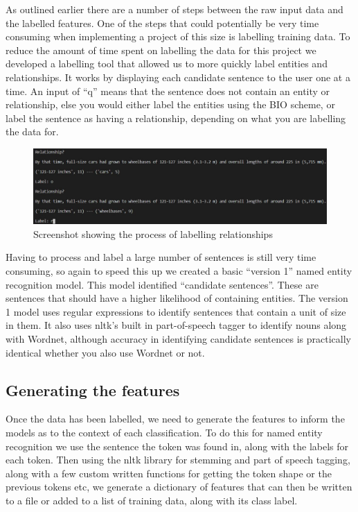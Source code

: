 \documentclass[11pt,oneside]{book}
\begin{document}
As outlined earlier there are a number of steps between the raw input data and the labelled features. One of the steps that could potentially be very time consuming when implementing a project of this size is labelling training data. To reduce the amount of time spent on labelling the data for this project we developed a labelling tool that allowed us to more quickly label entities and relationships. It works by displaying each candidate sentence to the user one at a time. An input of “q” means that the sentence does not contain an entity or relationship, else you would either label the entities using the BIO scheme, or label the sentence as having a relationship, depending on what you are labelling the data for.

\begin{figure}[!htbp]
\centering
\includegraphics[scale=0.5]{images/relationship_labelling_2.jpg}
\caption{Screenshot showing the process of labelling relationships}
\label{img:relationship_labelling}
\end{figure}

Having to process and label a large number of sentences is still very time consuming, so again to speed this up we created a basic “version 1” named entity recognition model. This model identified “candidate sentences”. These are sentences that should have a higher likelihood of containing entities. The version 1 model uses regular expressions to identify sentences that contain a unit of size in them. It also uses nltk's built in part-of-speech tagger to identify nouns along with Wordnet, although accuracy in identifying candidate sentences is practically identical whether you also use Wordnet or not.

\subsection{Generating the features}
Once the data has been labelled, we need to generate the features to inform the models as to the context of each classification. To do this for named entity recognition we use the sentence the token was found in, along with the labels for each token. Then using the nltk library for stemming and part of speech tagging, along with a few custom written functions for getting the token shape or the previous tokens etc, we generate a dictionary of features that can then be written to a file or added to a list of training data, along with its class label.
\end{document}
